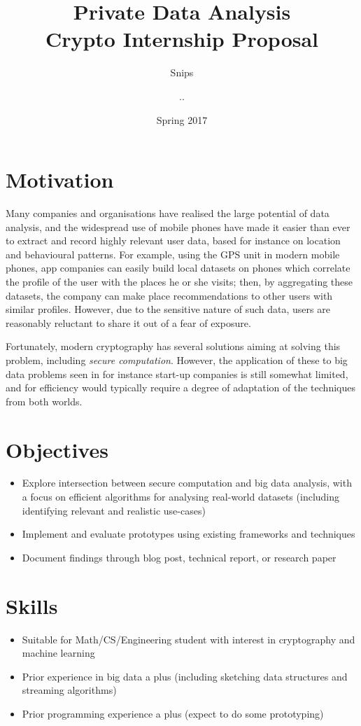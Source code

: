 \documentclass{article}
\title{Private Data Analysis \\ {\large Crypto Internship Proposal}}
\author{{\small Snips} \and {\small ..}}
\date{Spring 2017}
\begin{document}
\maketitle

\section*{Motivation}
Many companies and organisations have realised the large potential of data analysis, and the widespread use of mobile phones have made it easier than ever to extract and record highly relevant user data, based for instance on location and behavioural patterns. For example, using the GPS unit in modern mobile phones, app companies can easily build local datasets on phones which correlate the profile of the user with the places he or she visits; then, by aggregating these datasets, the company can make place recommendations to other users with similar profiles. However, due to the sensitive nature of such data, users are reasonably reluctant to share it out of a fear of exposure. 

Fortunately, modern cryptography has several solutions aiming at solving this problem, including \emph{secure computation}. However, the application of these to big data problems seen in for instance start-up companies is still somewhat limited, and for efficiency would typically require a degree of adaptation of the techniques from both worlds.


\section*{Objectives}
\begin{itemize}
\item Explore intersection between secure computation and big data analysis, with a focus on efficient algorithms for analysing real-world datasets (including identifying relevant and realistic use-cases)
\item Implement and evaluate prototypes using existing frameworks and techniques
\item Document findings through blog post, technical report, or research paper
\end{itemize}

\section*{Skills}
\begin{itemize}
\item Suitable for Math/CS/Engineering student with interest in cryptography and machine learning
\item Prior experience in big data a plus (including sketching data structures and streaming algorithms)
\item Prior programming experience a plus (expect to do some prototyping)
\end{itemize}
\end{document}
